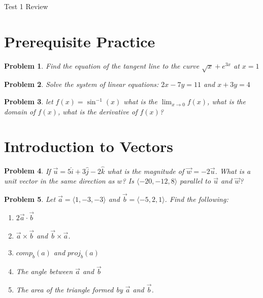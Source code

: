 \documentclass[11pt]{article}
\newtheorem{problem}{Problem}
\newcommand{\vs}{\vspace*{.1in}}
\begin{document}
\begin{huge}
    \begin{center}
        Test 1 Review
    \end{center}
\end{huge}


\vs\vs

\section{Prerequisite Practice}

\begin{problem}
Find the equation of the tangent line to the curve  $\sqrt{x}+e^{3x}$ at $x= 1$
\end{problem}
\begin{problem}
Solve the system of linear equations: $2x-7y=11$ and $x+3y=4$   
\end{problem}
\begin{problem}
let  $f(x)=\sin^{-1}(x)$ what is the $\lim_{x\to 0}f(x)$, what is the domain of $f(x)$, what is the derivative of $f(x)$?
\end{problem}

\section{Introduction to Vectors}

\begin{problem}
If $\vec{u} = 5\hat{i}+3\hat{j}-2\hat{k}$ what is the magnitude of $\vec{w} = -2\vec{u}$. What is a unit vector in the same direction as $w$? Is $\langle -20, -12, 8 \rangle$ parallel to $\vec{u}$ and $\vec{w}$?  
\end{problem}

\begin{problem}
Let $\vec{a} = \langle 1,-3,-3 \rangle$ and $\vec{b} = \langle -5, 2, 1 \rangle$. Find the following:
\begin{enumerate}
    \item $2\vec{a} \cdot \vec{b}$
    \item $\vec{a} \times \vec{b}$ and $\vec{b} \times \vec{a}$.
    \item $comp_{b}(a)$ and $proj_{b}(a)$
    \item The angle between $\vec{a}$ and $\vec{b}$
    \item The area of the triangle formed by $\vec{a}$ and $\vec{b}$.
\end{enumerate}
\end{problem}
\end{document}
